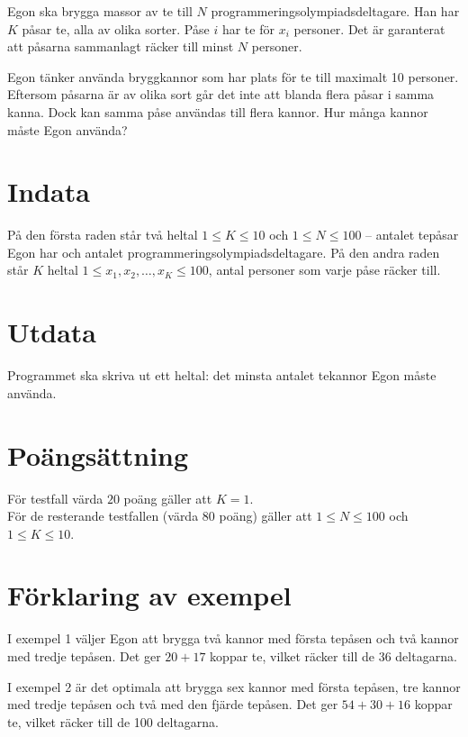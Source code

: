 Egon ska brygga massor av te till $N$ programmeringsolympiadsdeltagare.
Han har $K$ påsar te, alla av olika sorter.
Påse $i$ har te för $x_i$ personer.
Det är garanterat att påsarna sammanlagt räcker till minst $N$ personer.

Egon tänker använda bryggkannor som har plats för te till maximalt 10 personer.
Eftersom påsarna är av olika sort
går det inte att blanda flera påsar i samma kanna.
Dock kan samma påse användas till flera kannor.
Hur många kannor måste Egon använda?

\section*{Indata}
På den första raden står två heltal $1 \le K \le 10$ och $1 \le N \le 100$ 
 -- antalet tepåsar Egon har och antalet programmeringsolympiadsdeltagare. 
På den andra raden står $K$ heltal $1 \le x_1, x_2, \dots, x_K \le 100$,
antal personer som varje påse räcker till.

\section*{Utdata}
Programmet ska skriva ut ett heltal: det minsta antalet tekannor Egon måste använda. 

\section*{Poängsättning}
För testfall värda $20$ poäng gäller att $K=1$. \\
För de resterande testfallen (värda $80$ poäng) gäller att $1\leq N\leq 100$ och $1\leq K\leq 10$.

\section*{Förklaring av exempel}
I exempel 1 väljer Egon att brygga två kannor med första tepåsen 
och två kannor med tredje tepåsen. Det ger $20+17$ koppar te, vilket
räcker till de 36 deltagarna.

I exempel 2 är det optimala att brygga sex kannor med första tepåsen,
tre kannor med tredje tepåsen och två med den fjärde tepåsen.
Det ger $54+30+16$ koppar te, vilket räcker till de 100  deltagarna.
